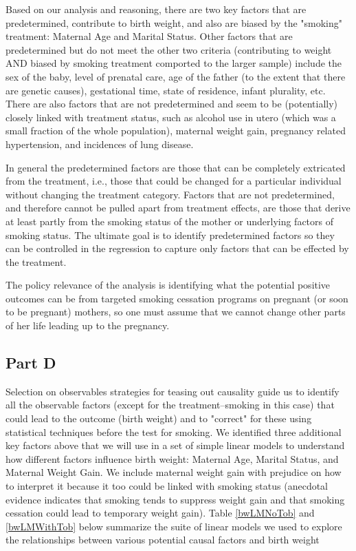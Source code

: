 \documentclass[a4paper, 12pt]{article}
\begin{document}
Based on our analysis and reasoning, there are two key factors that are predetermined, contribute to birth weight, and also are biased by the "smoking" treatment: Maternal Age and Marital Status.  Other factors that are predetermined but do not meet the other two criteria (contributing to weight AND biased by smoking treatment comported to the larger sample) include the sex of the baby, level of prenatal care, age of the father (to the extent that there are genetic causes), gestational time, state of residence, infant plurality, etc.  There are also factors that are not predetermined and seem to be (potentially) closely linked with treatment status, such as alcohol use in utero (which was a small fraction of the whole population), maternal weight gain, pregnancy related hypertension, and incidences of lung disease.  \newline

In general the predetermined factors are those that can be completely extricated from the treatment, i.e., those that could be changed for a particular individual without changing the treatment category.  Factors that are not predetermined, and therefore cannot be pulled apart from treatment effects, are those that derive at least partly from the smoking status of the mother or underlying factors of smoking status.  The ultimate goal is to identify predetermined factors so they can be controlled in the regression to capture only factors that can be effected by the treatment.  \newline

The policy relevance of the analysis is identifying what the potential positive outcomes can be from targeted smoking cessation programs on pregnant (or soon to be pregnant) mothers, so one must assume that we cannot change other parts of her life leading up to the pregnancy.  

\subsection{Part D}

Selection on observables strategies for teasing out causality guide us to identify all the observable factors (except for the treatment--smoking in this case) that could lead to the outcome (birth weight) and to "correct" for these using statistical techniques before the test for smoking.  We identified three additional key factors above that we will use in a set of simple linear models to understand how different factors influence birth weight: Maternal Age, Marital Status, and Maternal Weight Gain.  We include maternal weight gain with prejudice on how to interpret it because it too could be linked with smoking status (anecdotal evidence indicates that smoking tends to suppress weight gain and that smoking cessation could lead to temporary weight gain).  Table \ref{bwLMNoTob} and \ref{bwLMWithTob} below summarize the suite of linear models we used to explore the relationships between various potential causal factors and birth weight\newline
\end{document}
